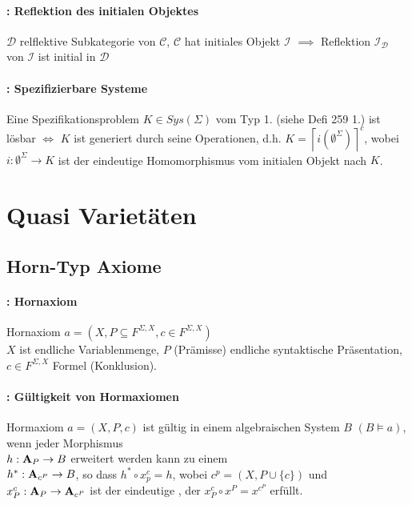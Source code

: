 \paragraph{: Reflektion des initialen Objektes}
$\mathcal{D}$ relflektive Subkategorie von $\mathcal{C}$, $\mathcal{C}$ hat initiales Objekt $\mathcal{I}$ $\implies$ Reflektion $\mathcal{I}_{\mathcal{D}}$ von $\mathcal{I}$ ist initial in $\mathcal{D}$

\paragraph{: Spezifizierbare Systeme}
Eine Spezifikationsproblem $K \in Sys(\Sigma)$ vom Typ 1. (siehe Defi 259 1.) ist lösbar $\Leftrightarrow$ $K$ ist generiert durch seine Operationen, d.h. $K = \left\lceil i\left(\emptyset^{\Sigma}\right)\right\rceil ^{c}$, wobei $i: \emptyset^\Sigma \rightarrow K$ ist der eindeutige Homomorphismus vom initialen Objekt nach $K$.

\section{Quasi Varietäten}

\subsection{Horn-Typ Axiome}

\paragraph{: Hornaxiom}
Hornaxiom $a = (X, P \subseteq F^{\Sigma,X}, c \in F^{\Sigma,X})$ \\
$X$ ist endliche Variablenmenge, $P$ (Prämisse) endliche syntaktische Präsentation, $c \in F^{\Sigma,X}$ Formel (Konklusion).

\paragraph{: Gültigkeit von Hormaxiomen}
Hormaxiom $a = (X, P, c)$ ist gültig in einem algebraischen System $B$ $(B \models a)$, wenn jeder Morphismus \\ $h: \mathbf{A}_P \rightarrow B$ erweitert werden kann zu einem \homo \\ $h^*: \mathbf{A}_{c^P} \rightarrow B$, so dass $h^* \circ x_{p}^c = h$, wobei $c^p = (X,P \cup \{c\})$ und $x^{c}_P: \mathbf{A}_P \rightarrow \mathbf{A}_{c^P}$ ist der eindeutige \homo, der $x_P^c \circ x^P = x^{c^P}$ erfüllt.

